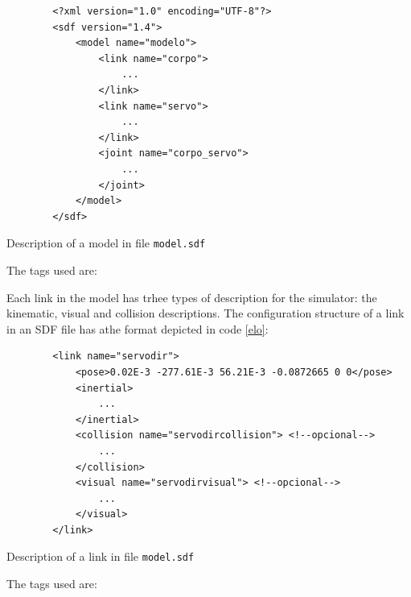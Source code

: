 \begin{code}[H]
	\begin{verbatim}
		<?xml version="1.0" encoding="UTF-8"?>
		<sdf version="1.4">
			<model name="modelo">
				<link name="corpo">
					...
				</link>
				<link name="servo">
					...
				</link>
				<joint name="corpo_servo">
					...
				</joint>
			</model>
		</sdf>
	\end{verbatim}
	\caption{Description of a model in file \texttt{model.sdf}}
	\label{geral}
\end{code}

The tags used are:

\small
\begin{itemize}
	\setlength{\itemsep}{1pt}
	\setlength{\parskip}{0pt}
	\setlength{\parsep}{0pt}
\end{itemize}\normalsize

Each link in the model has trhee types of description for the simulator: the kinematic, visual and collision descriptions. The configuration structure of a link in an SDF file has athe format depicted in code \ref{elo}:

\begin{code}[H]
	\begin{verbatim}
		<link name="servodir">
			<pose>0.02E-3 -277.61E-3 56.21E-3 -0.0872665 0 0</pose>
			<inertial> 
				...
			</inertial>
			<collision name="servodircollision"> <!--opcional-->
				...
			</collision>
			<visual name="servodirvisual"> <!--opcional-->
				...
			</visual>
		</link>
	\end{verbatim}
	\caption{Description of a link in file \texttt{model.sdf}}
	\label{elo}
\end{code}

The tags used are:

\small
\begin{itemize}
	\setlength{\itemsep}{1pt}
	\setlength{\parskip}{0pt}
	\setlength{\parsep}{0pt}
\end{itemize}
\normalsize

